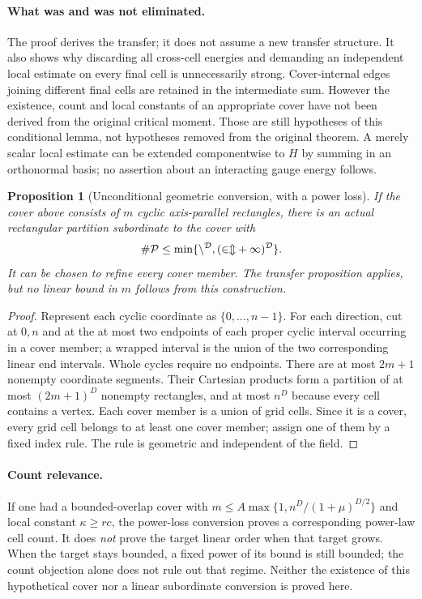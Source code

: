 \documentclass[11pt]{article}
\newtheorem{proposition}{Proposition}
\begin{document}
\paragraph{What was and was not eliminated.}
The proof derives the transfer; it does not assume a new transfer structure.
It also shows why discarding all cross-cell energies and demanding an
independent local estimate on every final cell is unnecessarily strong.
Cover-internal edges joining different final cells are retained in the
intermediate sum. However the existence, count and local constants of an
appropriate cover have not been derived from the original critical moment.
Those are still hypotheses of this conditional lemma, not hypotheses removed
from the original theorem. A merely scalar local estimate can be extended
componentwise to $H$ by summing in an orthonormal basis; no assertion about an
interacting gauge energy follows.

\begin{proposition}[Unconditional geometric conversion, with a power loss]
If the cover above consists of $m$ cyclic axis-parallel rectangles, there is
an actual rectangular partition subordinate to the cover with
\[
 \#\cal P\le \min\{n^D,(2m+1)^D\}.
\]
It can be chosen to refine every cover member. The transfer proposition
applies, but no linear bound in $m$ follows from this construction.
\end{proposition}
\begin{proof}
Represent each cyclic coordinate as $\{0,\ldots,n-1\}$. For each direction,
cut at $0,n$ and at the at most two endpoints of each proper cyclic
interval occurring in a cover member; a wrapped interval is the union of the
two corresponding linear end intervals. Whole cycles require no endpoints.
There are at most $2m+1$ nonempty coordinate segments. Their Cartesian
products form a partition of at most $(2m+1)^D$ nonempty rectangles, and at
most $n^D$ because every cell contains a vertex. Each cover member is a union
of grid cells. Since it is a cover, every grid cell belongs to at least one
cover member; assign one of them by a fixed index rule. The rule is geometric
and independent of the field.
\end{proof}

\paragraph{Count relevance.}
If one had a bounded-overlap cover with
$m\le A\max\{1,n^D/(1+\mu)^{D/2}\}$ and local constant $\kappa\ge rc$,
the power-loss conversion proves a corresponding power-law cell count.
It does \emph{not} prove the target linear order when that target grows.
When the target stays bounded, a fixed power of its bound is still bounded;
the count objection alone does not rule out that regime. Neither the
existence of this hypothetical cover nor a linear subordinate conversion is
proved here.
\end{document}
